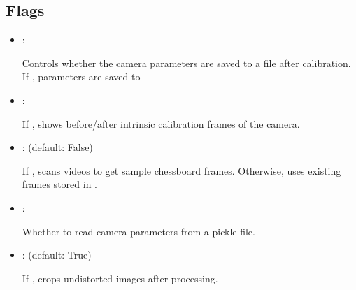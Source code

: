 \documentclass[letterpaper,10pt,english]{sphinxmanual}
\begin{document}
\subsection{Flags}
\label{\detokenize{conf:flags}}\begin{itemize}
\item {} 
\sphinxAtStartPar
{}: 

\sphinxAtStartPar
Controls whether the camera parameters are saved to a file after calibration.
If , parameters are saved to 

\item {} 
\sphinxAtStartPar
{}: 

\sphinxAtStartPar
If , shows before/after intrinsic calibration frames of the camera.

\item {} 
\sphinxAtStartPar
{}:  (default: False)

\sphinxAtStartPar
If , scans videos to get sample chessboard frames. Otherwise, uses existing frames stored in .

\item {} 
\sphinxAtStartPar
{}: 

\sphinxAtStartPar
Whether to read camera parameters from a pickle file.

\item {} 
\sphinxAtStartPar
{}:  (default: True)

\sphinxAtStartPar
If , crops undistorted images after processing.

\end{itemize}
\end{document}
